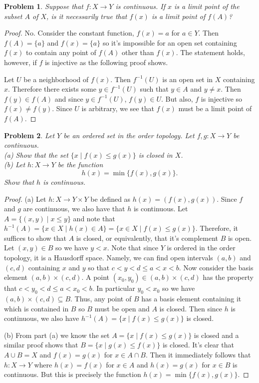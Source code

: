 \documentclass{article}
\newtheorem{problem}{Problem}
\begin{document}
\begin{problem}
Suppose that $f : X \to Y$ is continuous. If $x$ is a limit point of the subset $A$ of $X$, is it necessarily true that $f(x)$ is a limit point of $f(A)$?
\end{problem}
\begin{proof}
No. Consider the constant function, $f(x) = a$ for $a \in Y$. Then $f(A) = \{a\}$ and $f(x) = \{a\}$ so it's impossible for an open set containing $f(x)$ to contain any point of $f(A)$ other than $f(x)$. The statement holds, however, if $f$ is injective as the following proof shows.

Let $U$ be a neighborhood of $f(x)$. Then $f^{-1}(U)$ is an open set in $X$ containing $x$. Therefore there exists some $y \in f^{-1}(U)$ such that $y \in A$ and $y \neq x$. Then $f(y) \in f(A)$ and since $y \in f^{-1}(U)$, $f(y) \in U$. But also, $f$ is injective so $f(x) \neq f(y)$. Since $U$ is arbitrary, we see that $f(x)$ must be a limit point of $f(A)$.
\end{proof}

\begin{problem}
Let $Y$ be an ordered set in the order topology. Let $f,g : X \to Y$ be continuous.\\
(a) Show that the set $\{x \mid f(x) \leq g(x)\}$ is closed in $X$.\\
(b) Let $h : X \to Y$ be the function
\[
h(x) = \min \{f(x), g(x)\}.
\]
Show that $h$ is continuous.
\end{problem}
\begin{proof}
(a) Let $h : X \to Y \times Y$ be defined as $h(x) = (f(x), g(x))$. Since $f$ and $g$ are continuous, we also have that $h$ is continuous. Let $A = \{(x,y) \mid x \leq y\}$ and note that $h^{-1}(A) = \{x \in X \mid h(x) \in A\} = \{x \in X \mid f(x) \leq g(x)\}$. Therefore, it suffices to show that $A$ is closed, or equivalently, that it's complement $B$ is open. Let $(x,y) \in B$ so we have $y < x$. Note that since $Y$ is ordered in the order topology, it is a Hausdorff space. Namely, we can find open intervals $(a,b)$ and $(c,d)$ containing $x$ and $y$ so that $c < y < d \leq a < x < b$. Now consider the basis element $(a,b) \times (c,d)$. A point $(x_0, y_0) \in (a,b) \times (c,d)$ has the property that $c < y_0 < d \leq a < x_0 < b$. In particular $y_0 < x_0$ so we have $(a,b) \times (c,d) \subseteq B$. Thus, any point of $B$ has a basis element containing it which is contained in $B$ so $B$ must be open and $A$ is closed. Then since $h$ is continuous, we also have $h^{-1}(A) = \{x \mid f(x) \leq g(x)\}$ is closed.

(b) From part (a) we know the set $A = \{x \mid f(x) \leq g(x)\}$ is closed and a similar proof shows that $B = \{x \mid g(x) \leq f(x)\}$ is closed. It's clear that $A \cup B = X$ and $f(x) = g(x)$ for $x \in A \cap B$. Then it immediately follows that $h : X \to Y$ where $h(x) = f(x)$ for $x \in A$ and $h(x) = g(x)$ for $x \in B$ is continuous. But this is precisely the function $h(x) = \min \{f(x), g(x)\}$.
\end{proof}
\end{document}
